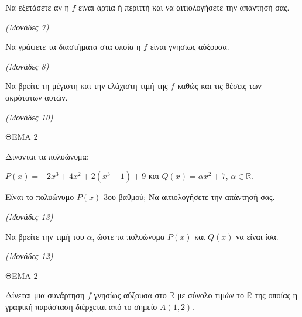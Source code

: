 \documentclass[11pt,a4paper,twoside]{book}
\newcommand{\monades}[1]{\hfill \textit{(Μονάδες #1)}}
\begin{document}
\begin{alist}
\item Να εξετάσετε αν η $f$ είναι άρτια ή περιττή και να αιτιολογήσετε την απάντησή σας.

\monades{7}

\item Να γράψετε τα διαστήματα στα οποία η $f$ είναι γνησίως αύξουσα.

\monades{8}

\item Να βρείτε τη μέγιστη και την ελάχιστη τιμή της $f$ καθώς και τις θέσεις των ακρότατων αυτών.

\monades{10}
\end{alist}

\vspace{4mm}

ΘΕΜΑ 2

Δίνονται τα πολυώνυμα:

$P(x) = -2x^3 + 4x^2 + 2(x^3 - 1) + 9$ και $Q(x) = \alpha x^2 + 7$, $\alpha \in \mathbb{R}$.

\begin{alist}
\item Είναι το πολυώνυμο $P(x)$ 3ου βαθμού; Να αιτιολογήσετε την απάντησή σας.

\monades{13}

\item Να βρείτε την τιμή του $\alpha$, ώστε τα πολυώνυμα $P(x)$ και $Q(x)$ να είναι ίσα.

\monades{12}
\end{alist}

\vspace{4mm}

ΘΕΜΑ 2

Δίνεται μια συνάρτηση $f$ γνησίως αύξουσα στο $\mathbb{R}$ με σύνολο τιμών το $\mathbb{R}$ της οποίας η γραφική παράσταση διέρχεται από το σημείο $A(1, 2)$.
\end{document}
